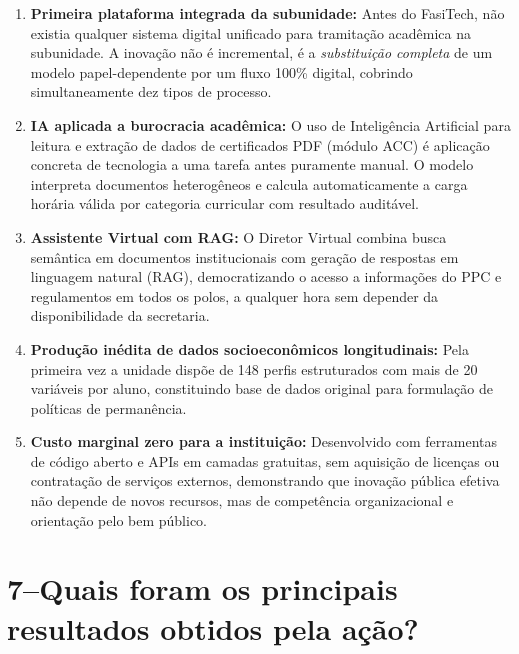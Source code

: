 \documentclass[12pt,a4paper]{article}
\begin{document}
\begin{tcolorbox}[successbox, title={\faStar\; Dimensões de Inovação do FasiTech},
  fonttitle=\bfseries\small\color{darkgreen!80!black}]

\begin{enumerate}[label={\color{darkgreen}\textbf{\arabic*.}}, itemsep=5pt]
  \item \textbf{Primeira plataforma integrada da subunidade:} Antes do FasiTech, não existia
    qualquer sistema digital unificado para tramitação acadêmica na subunidade. A inovação não
    é incremental, é a \textit{substituição completa} de um modelo papel-dependente por
    um fluxo 100\% digital, cobrindo simultaneamente dez tipos de processo.

  \item \textbf{IA aplicada a burocracia acadêmica:} O uso de Inteligência Artificial para
    leitura e extração de dados de certificados PDF (módulo ACC) é aplicação concreta de
    tecnologia a uma tarefa antes puramente manual. O modelo interpreta documentos
    heterogêneos e calcula automaticamente a carga horária válida por categoria
    curricular com resultado auditável.

  \item \textbf{Assistente Virtual com RAG:} O Diretor Virtual combina busca semântica
    em documentos institucionais com geração de respostas em linguagem natural (RAG),
    democratizando o acesso a informações do PPC e regulamentos em todos os polos,
    a qualquer hora sem depender da disponibilidade da secretaria.

  \item \textbf{Produção inédita de dados socioeconômicos longitudinais:} Pela primeira
    vez a unidade dispõe de 148 perfis estruturados com mais de 20 variáveis por aluno,
    constituindo base de dados original para formulação de políticas de permanência.

  \item \textbf{Custo marginal zero para a instituição:} Desenvolvido com ferramentas de
    código aberto e APIs em camadas gratuitas, sem aquisição de licenças ou contratação
    de serviços externos, demonstrando que inovação pública efetiva não depende de
    novos recursos, mas de competência organizacional e orientação pelo bem público.
\end{enumerate}
\end{tcolorbox}

\section{7\;–\;Quais foram os principais resultados obtidos pela ação?}
\end{document}
